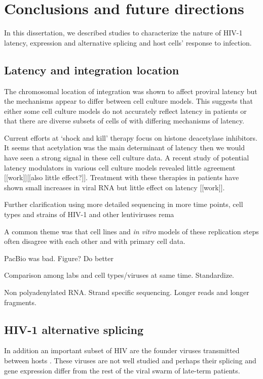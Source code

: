 \documentclass[../sherrill-Mix_thesis.tex]{subfiles}
\begin{document}
\chapter{Conclusions and future directions}
\graphicspath{{im/}{conclusion/im/}}

In this dissertation, we described studies to characterize the nature of HIV-1 latency, expression and alternative splicing and host cells' response to infection.

\section{Latency and integration location}

	The chromosomal location of integration was shown to affect proviral latency but the mechanisms appear to differ between cell culture models. This suggests that either some cell culture models do not accurately reflect latency in patients or that there are diverse subsets of cells of with differing mechanisms of latency. 

	Current efforts at `shock and kill' therapy focus on histone deacetylase inhibitors. It seems that acetylation was the main determinant of latency then we would have seen a strong signal in these cell culture data. A recent study of potential latency modulators in various cell culture models revealed little agreement [[work]][[also little effect?]]. Treatment with these therapies in patients have shown small increases in viral RNA but little effect on latency [[work]].


Further clarification using more detailed sequencing in more time points, cell types and strains of HIV-1 and other lentiviruses rema

A common theme was that cell lines and \textit{in vitro} models of these replication steps often disagree with each other and with primary cell data. 

PacBio was bad. Figure? Do better

Comparison among labs and cell types/viruses at same time. Standardize.

Non polyadenylated RNA. Strand specific sequencing. Longer reads and longer fragments.

\section{HIV-1 alternative splicing}
In addition an important subset of HIV are the founder viruses transmitted between hosts \citep{Keele2008,Salazar-Gonzalez2009}. These viruses are not well studied and perhaps their splicing and gene expression differ from the rest of the viral swarm of late-term patients.
\end{document}
